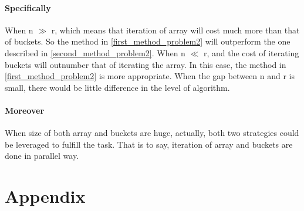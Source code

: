 \documentclass[a4paper]{article}   %
\begin{document}
\begin{CJK}{UTF8}{gbsn}
\begin{spacing}{1.2}
\paragraph*{Specifically}
When n $\gg$ r, which means that iteration of array will cost much more than that of buckets. So the method in \ref{first_method_problem2} will outperform the one described in \ref{second_method_problem2}. When n $\ll$ r, and the cost of iterating buckets will outnumber that of iterating the array. In this case, the method in \ref{first_method_problem2} is more appropriate. When the gap between n and r is small, there would be little difference in the level of algorithm. 
\paragraph*{Moreover} When size of both array and buckets are huge, actually, both two strategies could be leveraged to fulfill the task. That is to say, iteration of array and buckets are done in parallel way. 




\appendix
\section*{Appendix}


\end{spacing}
\end{CJK}
\end{document}
